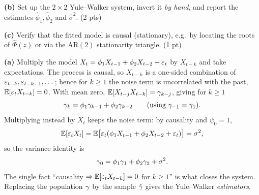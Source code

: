 \documentclass[11pt]{article}
\begin{document}
\textbf{(b)} Set up the $2\times2$ Yule--Walker system, invert it \emph{by hand}, and report the estimates $\hat\phi_1,\hat\phi_2$ and $\hat\sigma^{2}$. \hfill(2 pts)

\textbf{(c)} Verify that the fitted model is causal (stationary), e.g.\ by locating the roots of $\hat\Phi(z)$ or via the $\mathrm{AR}(2)$ stationarity triangle. \hfill(1 pt)
\statementend

\textbf{(a)} Multiply the model $X_t=\phi_1X_{t-1}+\phi_2X_{t-2}+\varepsilon_t$ by $X_{t-k}$ and take expectations. The process is causal, so $X_{t-k}$ is a one-sided combination of $\varepsilon_{t-k},\varepsilon_{t-k-1},\dots$; hence for $k\ge1$ the noise term is uncorrelated with the past, $\mathbb{E}[\varepsilon_tX_{t-k}]=0$. With mean zero, $\mathbb{E}[X_{t-j}X_{t-k}]=\gamma_{k-j}$, giving for $k\ge1$
\[
\gamma_k=\phi_1\gamma_{k-1}+\phi_2\gamma_{k-2}\qquad(\text{using }\gamma_{-1}=\gamma_1).
\]
Multiplying instead by $X_t$ keeps the noise term: by causality and $\psi_0=1$,
\[
\mathbb{E}[\varepsilon_tX_t]=\mathbb{E}\bigl[\varepsilon_t(\phi_1X_{t-1}+\phi_2X_{t-2}+\varepsilon_t)\bigr]=\sigma^{2},
\]
so the variance identity is
\[
\gamma_0=\phi_1\gamma_1+\phi_2\gamma_2+\sigma^{2}.
\]
The single fact ``causality $\Rightarrow\mathbb{E}[\varepsilon_tX_{t-k}]=0$ for $k\ge1$'' is what closes the system. Replacing the population $\gamma$ by the sample $\hat{\gamma}$ gives the Yule--Walker \emph{estimators}.
\end{document}
